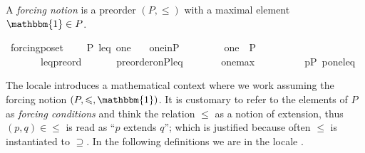 \begin{definition}
  A \emph{forcing notion} is a preorder $(P,\leqslant)$ with a maximal element $\mathbbm{1} \in P$.
  \begin{isabelle}
\isamarkupfalse%
\ forcing{\isacharunderscore}poset\ {\isacharequal}\isanewline
\ \ \ P\ leq\ one\isanewline
\ \ \ one{\isacharunderscore}in{\isacharunderscore}P{\isacharcolon}\ \ \ \ \ \ \ \ \ {\isachardoublequoteopen}one\ {\isasymin}\ P{\isachardoublequoteclose}\isanewline
\ \ \ \ \ \ \ leq{\isacharunderscore}preord{\isacharcolon}\ \ \ \ \ \ \ {\isachardoublequoteopen}preorder{\isacharunderscore}on{\isacharparenleft}P{\isacharcomma}leq{\isacharparenright}{\isachardoublequoteclose}\isanewline
\ \ \ \ \ \ \ one{\isacharunderscore}max{\isacharcolon}\ \ \ \ \ \ \ \ \ \ {\isachardoublequoteopen}{\isasymforall}p{\isasymin}P{\isachardot}\ {\isasymlangle}p{\isacharcomma}one{\isasymrangle}{\isasymin}leq{\isachardoublequoteclose}
\end{isabelle}
\end{definition}
\noindent The locale  introduces a mathematical
context where we work assuming the forcing notion
$(P,\leqslant, \mathbbm{1})$. It is customary to refer to the elements
of $P$ as \emph{forcing conditions} and think the relation $\leqslant$
as a notion of extension, thus $(p,q) \in \leqslant$ is read as ``$p$
extends $q$''; which is justified because often $\leqslant$ is
instantiated to $\supseteq$. In the following definitions we are in
the locale .

